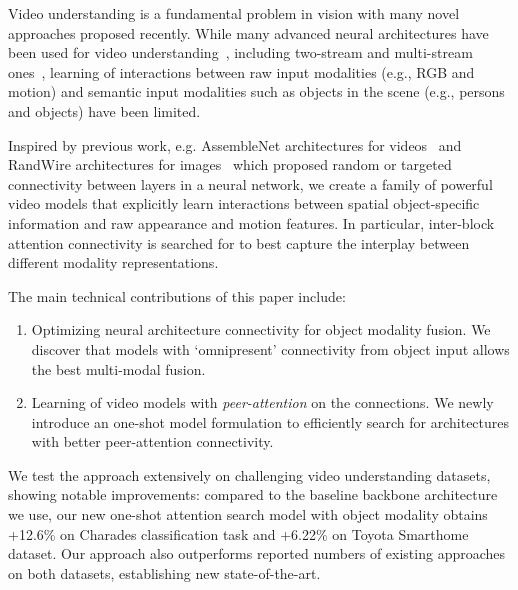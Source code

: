 \documentclass[runningheads]{llncs}
\begin{document}
Video understanding is a fundamental problem in vision with many novel approaches proposed recently.
While many advanced neural architectures have been used for video understanding~\cite{carreira2017quo,tran2018closer}, including two-stream and multi-stream ones~\cite{carreira2017quo,feichtenhofer2018slowfast,ryoo2019assemblenet}, 
learning of interactions between raw input modalities (e.g., RGB and motion) and semantic input modalities such as objects in the scene (e.g., persons and objects) have been limited.






Inspired by previous work, e.g. AssembleNet architectures for videos~\cite{ryoo2019assemblenet} and RandWire architectures for images~\cite{randwire} which proposed random or targeted connectivity between layers in a neural network, we create a family of powerful video models that explicitly learn interactions between spatial object-specific information and raw appearance and motion features. In particular,  inter-block attention connectivity is searched for to best capture the interplay between different modality representations.



The main technical contributions of this paper include:
\begin{enumerate}
\item Optimizing neural architecture connectivity for object modality fusion. We discover that models with `omnipresent' connectivity from object input allows the best multi-modal fusion.

\item Learning of video models with \emph{peer-attention} on the connections. We newly introduce an one-shot model formulation to efficiently search for architectures with better peer-attention connectivity.
\end{enumerate}

We test the approach extensively on challenging video understanding datasets, showing notable improvements: compared to the baseline backbone architecture we use, our new one-shot attention search model with object modality obtains +12.6\% on Charades classification task and +6.22\% on Toyota Smarthome dataset. Our approach also outperforms reported numbers of existing approaches on both datasets, establishing new state-of-the-art.
\end{document}

